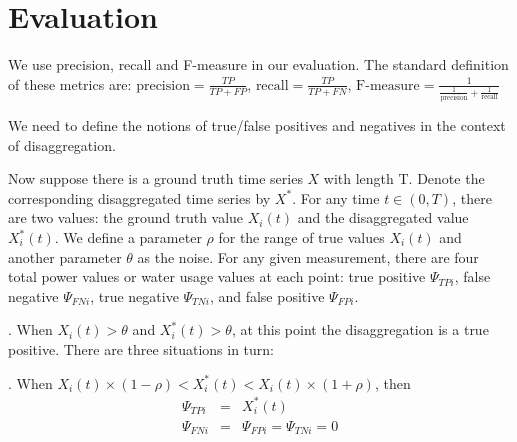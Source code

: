 \section{Evaluation}
%
%
We use precision, recall and F-measure in our evaluation. The standard
definition of these metrics are:
$\textrm{precision}=\frac{TP}{TP+FP}$, 
$\textrm{recall}=\frac{TP}{TP+FN}$,
$\textrm{F-measure}=\frac{1}{\frac{1}{\textrm{precision}}+\frac{1}{\textrm{recall}}}$

We need to define the notions of true/false positives
and negatives in the context of disaggregation.

Now suppose there is a ground truth time series $X$ with length T.
Denote the corresponding disaggregated time series by $X^*$.
For any time $t \in (0, T)$, there are two values: the
ground truth value $X_i(t)$ and the disaggregated value
$X_i^*(t)$. We define a parameter $\rho$ for the range of
true values $X_i(t)$ and another parameter $\theta$
as the noise.
For any given measurement, 
there are four total power values or water usage values at
each point: true positive $\Psi_{TPi}$,  false negative $\Psi_{FNi}$,
true negative $\Psi_{TNi}$, and false positive $\Psi_{FPi}$.

. When $X_i(t) > \theta$ and  $X_i^*(t)> \theta  $,
at this point the disaggregation is a true positive.
There are three situations in turn:

. When $  X_i(t) \times (1-\rho) <  X_i^*(t) <  X_i(t) \times (1+\rho)  $, then
\begin{eqnarray*}
 {\Psi}_{TPi} &=& X_i^*(t) \\
 \Psi_{FNi}&=&\Psi_{FPi} =\Psi_{TNi}=0
\end{eqnarray*}

